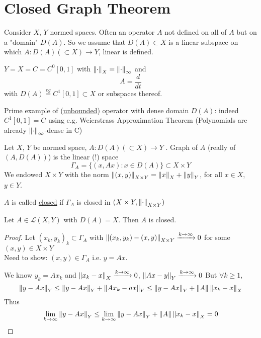 \documentclass{article}
\begin{document}
\section{Closed Graph Theorem}
Consider $X$, $Y$ normed spaces. Often an operator $A$ not defined on all of $A$ but on a "domain" $D(A)$. So we assume that 
$D(A)\subset X$ is a linear subspace on which $A:D(A)(\subset X)\to Y$, linear is defined.
\begin{example}\nl
$Y=X=C=C^0[0,1]$ with $\left\|{\cdot}\right\|_X=\left\|{\cdot}\right\|_\infty$ and 
$$A=\frac{d}{dt}$$
with $D(A)\stackrel{eg}{=}C^1[0,1]\subset X$ or subspaces thereof. 

Prime example of  (\underline{unbounded}) operator with dense domain $D(A)$: indeed $C^1[0,1]=C$ using e.g. Weierstrass Approximation Theorem (Polynomials are already $\left\|{\cdot}\right\|_\infty$-dense in C)
\end{example}
\begin{definition}[Graph]\nl
Let $X$, $Y$ be normed space, $A:D(A)(\subset X)\to Y$ . Graph of $A$ (really  of $(A,D(A))$) is the linear (!) space 
$$
\Gamma_A=\{(x,Ax):x\in D(A)\}\subset X\times Y
$$
We endowed $X\times Y$ with the norm $\left\|{(x,y)}\right\|_{X\times Y}=\left\|{x}\right\|_X+\left\|{y}\right\|_Y$, for all $x\in X$, $y\in Y$.
    
\end{definition}
\begin{definition}
$A$ is called \underline{closed} if $\Gamma_A$ is closed in  $(X\times Y,\left\|{\cdot}\right\|_{X\times Y})$
\end{definition}

\begin{example}
Let $A\in\mathcal{L}(X,Y)$ with $D(A)=X$. Then $A$ is closed.
\end{example}
\begin{proof}
	Let $(x_k,y_k)_k\subset \Gamma_A$  with $\left\|{(x_k,y_k)-(x,y)}\right\|_{X\times Y}\xrightarrow{k\to\infty}0$ for some $(x,y)\in X\times Y$\\
	Need to show: $(x,y)\in \Gamma_A$ i.e. $y=Ax$.   
 
	We know $ y_k=Ax_k$ and $\left\|{x_k-x}\right\|_X\xrightarrow{k\to\infty}0$, $\left\|{Ax-y}\right\|_Y\xrightarrow{k\to\infty}0$
	But $\forall k\geq 1$,
	$$\left\|{y-Ax}\right\|_Y\leq\left\|{y-Ax}\right\|_Y+\left\|{Ax_k-ax}\right\|_Y
	\leq \left\|{y-Ax}\right\|_Y+\left\|{A}\right\|\left\|{x_k-x}\right\|_X$$
	Thus 
	$$\lim_{k\to\infty}\left\|{y-Ax}\right\|_Y\leq\lim_{k\to\infty}\left\|{y-Ax}\right\|_Y+\left\|{A}\right\|\left\|{x_k-x}\right\|_X=0$$
\end{proof}
\end{document}
